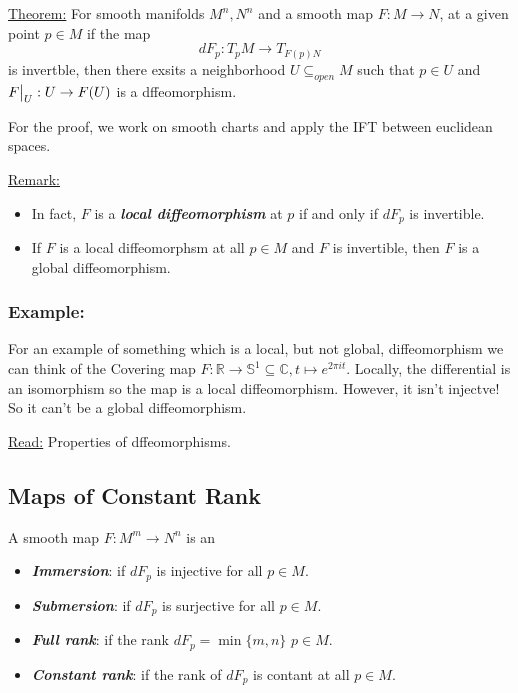 \documentclass{article}
\newcommand{\R}{\mathbb{R}}
\newcommand{\C}{\mathbb{C}}
\newcommand{\restr}[2]{{%
  \left.\kern-\nulldelimiterspace %
  #1 %
  \vphantom{\big|} %
  \right|_{#2} %
  }}
\begin{document}
\begin{dottedbox}
  \underline{Theorem:} For smooth manifolds $M^n, N^n$ and a smooth map $F : M \rightarrow N$, at a given point $p \in M$ if the map 
  \[ dF_p : T_pM \rightarrow T_{F(p)N} \] is invertble, then there exsits a neighborhood $U \subseteq_{open} M$ such that $p \in U$ and $\restr{F}{U} : U \rightarrow F(U)$ is a dffeomorphism.

  \vskip 0.5cm
  For the proof, we work on smooth charts and apply the IFT between euclidean spaces.
\end{dottedbox}

\underline{Remark:} 
\begin{itemize}
  \item In fact, $F$ is a \emph{\textbf{local diffeomorphism}} at $p$ if and only if $dF_p$ is invertible.
  \item If $F$ is a local diffeomorphsm at all $p \in M$ and $F$ is invertible, then $F$ is a global diffeomorphism.
\end{itemize}

\subsubsection*{Example:} 
For an example of something which is a local, but not global, diffeomorphism we can think of the Covering map $F : \R \rightarrow \mathbb{S}^1 \subseteq \C, t \mapsto e^{2\pi i t}$. Locally, the differential is an isomorphism so the map is a local diffeomorphism. However, it isn't injectve! So it can't be a global diffeomorphism.

\vskip 0.5cm
\underline{Read:} Properties of dffeomorphisms.

\vskip 1cm
\subsection{Maps of Constant Rank}


\begin{mathdefinitionbox}{}
  A smooth map $F : M^m \rightarrow N^n$ is an 
  \begin{itemize}
    \item \emph{\textbf{Immersion}}: if $dF_p$ is injective for all $p \in M$.
    \item \emph{\textbf{Submersion}}: if $dF_p$ is surjective for all $p \in M$.
    \item \emph{\textbf{Full rank}}: if the rank $dF_p = \min{\{m, n\}}$ $p \in M$.
    \item \emph{\textbf{Constant rank}}: if the rank of $dF_p$ is contant at all $p \in M$.
  \end{itemize}
\end{mathdefinitionbox}
\end{document}
